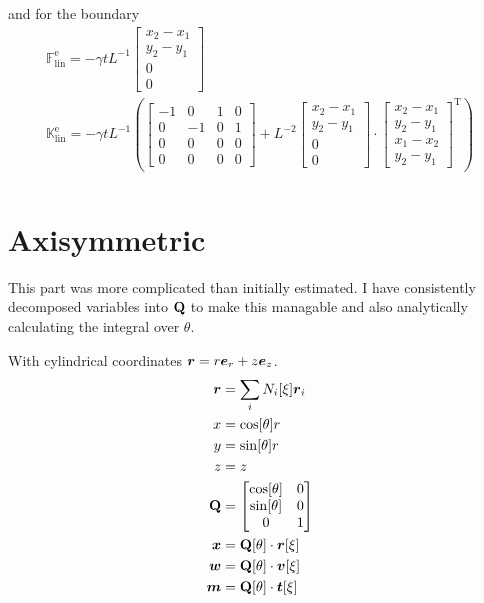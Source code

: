 \documentclass[a4paper,11pt]{article}
\renewcommand{\to}[1]{\text{\boldmath $#1$}} %
\newcommand{\ts}[1]{\text{\boldmath $\mathrm{#1}$}} %
\newcommand{\uv}[1]{\mathds{#1}}
\newcommand{\um}[1]{\mathds{#1}}
\newcommand{\T}{\mathrm{T}}
\newcommand{\element}{\mathrm{e}}
\newcommand{\linear}{\mathrm{lin}}
\begin{document}
and for the boundary
\begin{gather}
 \uv F^\element_\linear = -\gamma t L^{-1} \begin{bmatrix}x_2-x_1\\y_2-y_1\\0\\0\end{bmatrix}\\
 \um K^\element_\linear = -\gamma t L^{-1} \left(\begin{bmatrix}-1&0&1&0\\0&-1&0&1\\0&0&0&0\\0&0&0&0\end{bmatrix} + L^{-2} \begin{bmatrix}x_2-x_1\\y_2-y_1\\0\\0\end{bmatrix}\cdot\begin{bmatrix}x_2-x_1\\y_2-y_1\\x_1-x_2\\y_2-y_1\end{bmatrix}^\T\right)\\
\end{gather}

\section{Axisymmetric}
This part was more complicated than initially estimated.
I have consistently decomposed variables into $\ts Q$ to make this managable and also analytically calculating the integral over $\theta$.

With cylindrical coordinates $\to r = r\to e_r + z \to e_z$.
\begin{align}
 \to r &= \sum_i N_i[\xi]\to r_i\\
 x &= \cos[\theta] r\\
 y &= \sin[\theta] r\\
 z &= z\\
 \ts Q &= \begin{bmatrix}\cos[\theta] & 0\\ \sin[\theta] & 0\\ 0 & 1\end{bmatrix}\\
 \to x &= \ts Q[\theta] \cdot \to r[\xi]\\
 \to w &= \ts Q[\theta] \cdot \to v[\xi]\\
 \to m &= \ts Q[\theta] \cdot \to t[\xi]
\end{align}
\end{document}
